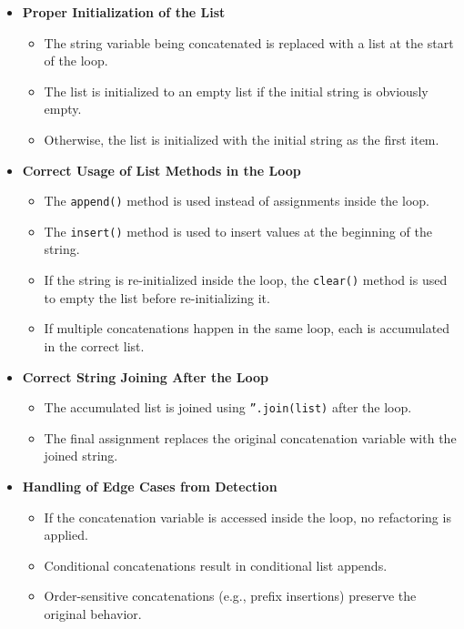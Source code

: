 \documentclass[12pt, titlepage]{article}
\begin{document}
  \begin{itemize}
    \item \textbf{Proper Initialization of the List}
      \begin{itemize}
        \item The string variable being concatenated is replaced with
          a list at the start of the loop.
        \item The list is initialized to an empty list if the initial
          string is obviously empty.
        \item Otherwise, the list is initialized with the initial
          string as the first item.
      \end{itemize}

    \item \textbf{Correct Usage of List Methods in the Loop}
      \begin{itemize}
        \item The \texttt{append()} method is used instead of
          assignments inside the loop.
        \item The \texttt{insert()} method is used to insert values
          at the beginning of the string.
        \item If the string is re-initialized inside the loop, the
          \texttt{clear()} method is used to empty the list before
          re-initializing it.
        \item If multiple concatenations happen in the same loop,
          each is accumulated in the correct list.
      \end{itemize}

    \item \textbf{Correct String Joining After the Loop}
      \begin{itemize}
        \item The accumulated list is joined using
          \texttt{''.join(list)} after the loop.
        \item The final assignment replaces the original
          concatenation variable with the joined string.
      \end{itemize}

    \item \textbf{Handling of Edge Cases from Detection}
      \begin{itemize}
        \item If the concatenation variable is accessed inside the
          loop, no refactoring is applied.
        \item Conditional concatenations result in conditional list appends.
        \item Order-sensitive concatenations (e.g., prefix
          insertions) preserve the original behavior.
      \end{itemize}


\end{itemize}
\end{document}
